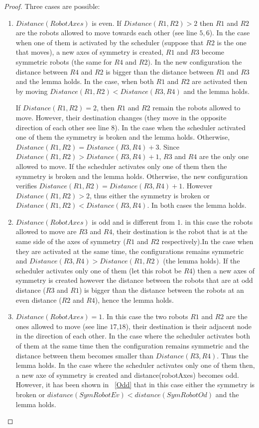 \documentclass[12pt]{llncs}
\begin{document}
\begin{proof}
Three cases are possible:
\begin{enumerate}
\item\label{even}{$Distance(RobotAxes)$ is even}. If $Distance(R1,R2)>2$ then $R1$ and $R2$ are the robots allowed to move towards each other (see line $5,6$). In the case when one of them is activated by the scheduler (suppose that $R2$ is the one that moves), a new axes of symmetry is created, $R1$ and $R3$ become symmetric robots (the same for $R4$ and $R2$). In the new configuration the distance between $R4$ and $R2$ is bigger than the distance between $R1$ and $R3$ and the lemma holds. In the case, when both  $R1$ and $R2$ are activated then by moving $Distance(R1,R2)< Distance(R3,R4)$ and the lemma holds. 

If $Distance(R1,R2)=2$, then $R1$ and $R2$ remain the robots allowed to move. However, their destination changes (they move in the opposite direction of each other see line $8$). In the case when the scheduler activated one of them the symmetry is broken and the lemma holds. Otherwise, $Distance(R1,R2)=Distance(R3,R4)+3$. Since $Distance(R1,R2)>Distance(R3,R4)+1$, $R3$ and $R4$ are the only one allowed to move. If the scheduler activates only one of them then the symmetry is broken and the lemma holds. Otherwise, the new configuration verifies $Distance(R1,R2)=Distance(R3,R4)+1$. However $Distance(R1,R2)>2$, thus either the symmetry is broken or $Distance(R1,R2)< Distance(R3,R4)$. In both cases the lemma holds.    

\item\label{Odd}{$Distance(RobotAxes)$ is odd and is different from $1$}. in this case the robots allowed to move are $R3$ and $R4$, their destination is the robot that is at the same side of the axes of symmetry ($R1$ and $R2$ respectively).In the case when they are activated at the same time, the configurations remains symmetric and $Distance(R3,R4) > Distance(R1,R2)$ (the lemma holds). If the scheduler activates only one of them (let this robot be $R4$) then a new axes of symmetry is created however the distance between the robots that are at odd distance ($R3$ and $R1$) is bigger than the distance between the robots at an even distance ($R2$ and $R4$), hence the lemma holds. 

\item\label{Odd1}{$Distance(RobotAxes)= 1$}. In this case the two robots $R1$ and $R2$ are the ones allowed to move (see line $17$,$18$), their destination is their adjacent node in the direction of each other. In the case where the scheduler activates both of them at the same time then the configuration remains symmetric and the distance between them becomes smaller than $Distance(R3,R4)$. Thus the lemma holds. In the case where the scheduler activates only one of them then, a new axe of symmetry is created and distance(robotAxes) becomes odd. However, it has been shown in ~\ref{Odd} that in this case either the symmetry is broken or $distance(SymRobotEv)<distance(SymRobotOd)$ and the lemma holds. \end{enumerate}
\end{proof}
\end{document}
